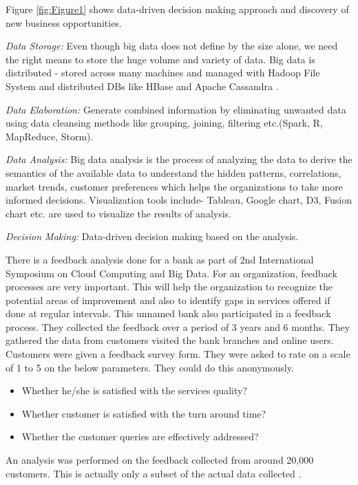 \documentclass[sigconf]{acmart}
\begin{document}
Figure \ref{fig:Figure1} shows data-driven decision making approach and discovery of new business opportunities.

\textit{Data Storage:} Even though big data does not define by the size alone, we need the right means to store the huge volume and variety of data. Big data is distributed - stored across many machines and managed with Hadoop File System and distributed DBs like HBase and Apache Cassandra \cite{big-data-storage}.

\textit{Data Elaboration:} Generate combined information by eliminating unwanted data using data cleansing methods like grouping, joining, filtering etc.(Spark, R, MapReduce, Storm). 

\textit{Data Analysis:} Big data analysis is the process of analyzing the data to derive the semantics of the available data to understand the hidden patterns, correlations, market trends, customer preferences which helps the organizations to take more informed decisions. Visualization tools include- Tableau, Google chart, D3, Fusion chart etc. are used to visualize the results of analysis.

\textit{Decision Making:} Data-driven decision making based on the analysis.
 
 There is a feedback analysis done for a bank as part of 2nd International Symposium on Cloud Computing and Big Data. For an organization, feedback processes are very important. This will help the organization to recognize the potential areas of improvement and also to identify gaps in services offered if done at regular intervals. This unnamed bank also participated in a feedback process. They collected the feedback over a period of 3 years and 6 months. They gathered the data from customers visited the bank branches and online users. Customers were given a feedback survey form. They were asked to rate on a scale of 1 to 5 on the below parameters. They could do this anonymously. 
 
\begin{itemize}
   \item Whether he/she is satisfied with the services quality?
   \item Whether customer is satisfied with the turn around time?
   \item Whether the customer queries are effectively addressed?
\end{itemize}

An analysis was performed on the feedback collected from around 20,000 customers. This is actually only a subset of the actual data collected \cite{bigdata-banking}. 
\end{document}
